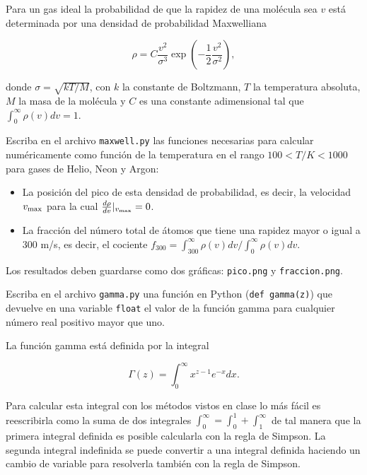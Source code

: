 \documentclass[11pt,letterpaper]{exam}
\begin{document}
\begin{questions}

Para un gas ideal la probabilidad de que la rapidez de una mol\'ecula
sea $v$ est\'a determinada por una densidad de probabilidad
Maxwelliana  

\begin{equation}
\rho = C\frac{v^2}{\sigma^3}\exp{\left(-\frac{1}{2}\frac{v^2}{\sigma^2}\right)}, 
\end{equation}

donde $\sigma=\sqrt{kT/M}$, con $k$ la constante de Boltzmann, $T$ la
temperatura absoluta, $M$ la masa de la mol\'ecula y $C$ es una
constante adimensional tal que $\int_{0}^{\infty}\rho(v)dv=1$.


Escriba en el archivo \verb"maxwell.py" las funciones necesarias para
calcular num\'ericamente como funci\'on de la temperatura en el rango
$100<T/K<1000$ para gases de Helio, Neon y Argon:  
\begin{itemize}
\item La posici\'on del pico de esta densidad de probabilidad, es
  decir, la velocidad $v_{\rm max}$ para la cual $\frac{d \rho}{dv}|_{v_{\rm max}}=0$.
\item La fracci\'on del n\'umero total de \'atomos que tiene una
  rapidez mayor o igual a $300$ m/s, es decir, el cociente $f_{300} =
  \int_{300}^{\infty}\rho(v)dv/\int_0^{\infty}\rho(v)dv$.
\end{itemize}
Los resultados deben guardarse como dos gr\'aficas: \verb"pico.png" y
\verb"fraccion.png". 




Escriba en el archivo \verb"gamma.py" una funci\'on en Python
(\verb"def gamma(z)") que devuelve en una variable \verb"float" el
valor de la funci\'on gamma para cualquier n\'umero real positivo
mayor que uno.  

La funci\'on gamma est\'a definida por la integral

\begin{equation}
\Gamma(z) = \int_{0}^{\infty}x^{z-1}e^{-x}dx.
\end{equation}

Para calcular esta integral con los m\'etodos vistos en clase lo m\'as
f\'acil es reescribirla como la suma de dos integrales $\int_0^{\infty} =
\int_{0}^{1} + \int_{1}^{\infty}$ de tal manera que la primera
integral definida es posible calcularla con la regla de Simpson. La
segunda integral indefinida se puede convertir a una integral definida
haciendo un cambio de variable para resolverla tambi\'en con la regla
de Simpson. 



\end{questions}
\end{document}

